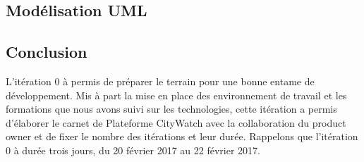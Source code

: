 \subsection{Modélisation UML}
\subsection{Conclusion}
L’itération 0 à permis de préparer le terrain pour une bonne entame de
développement. Mis à part la mise en place des environnement de travail et les
formations que nous avons suivi sur les technologies, cette itération a permis d’élaborer
le carnet de Plateforme CityWatch avec la collaboration du product owner et de fixer le
nombre des itérations et leur durée. Rappelons que l’itération 0 à durée trois jours,
du 20 février 2017 au 22 février 2017.